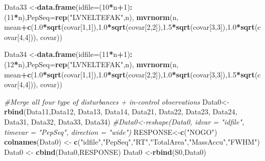 \documentclass[]{article}
\newenvironment{Shaded}{\begin{snugshade}}{\end{snugshade}}
\newcommand{\KeywordTok}[1]{\textcolor[rgb]{0.13,0.29,0.53}{\textbf{#1}}}
\newcommand{\DataTypeTok}[1]{\textcolor[rgb]{0.13,0.29,0.53}{#1}}
\newcommand{\DecValTok}[1]{\textcolor[rgb]{0.00,0.00,0.81}{#1}}
\newcommand{\FloatTok}[1]{\textcolor[rgb]{0.00,0.00,0.81}{#1}}
\newcommand{\StringTok}[1]{\textcolor[rgb]{0.31,0.60,0.02}{#1}}
\newcommand{\CommentTok}[1]{\textcolor[rgb]{0.56,0.35,0.01}{\textit{#1}}}
\newcommand{\OperatorTok}[1]{\textcolor[rgb]{0.81,0.36,0.00}{\textbf{#1}}}
\newcommand{\NormalTok}[1]{#1}
\begin{document}
\begin{Shaded}
\begin{Highlighting}[]
\NormalTok{Data33 <-}\KeywordTok{data.frame}\NormalTok{(}\DataTypeTok{idfile=}\NormalTok{(}\DecValTok{10}\OperatorTok{*}\NormalTok{n}\OperatorTok{+}\DecValTok{1}\NormalTok{)}\OperatorTok{:}\NormalTok{(}\DecValTok{11}\OperatorTok{*}\NormalTok{n),}\DataTypeTok{PepSeq=}\KeywordTok{rep}\NormalTok{(}\StringTok{"LVNELTEFAK"}\NormalTok{,n),}
                  \KeywordTok{mvrnorm}\NormalTok{(n, mean}\OperatorTok{+}\KeywordTok{c}\NormalTok{(}\FloatTok{1.0}\OperatorTok{*}\KeywordTok{sqrt}\NormalTok{(covar[}\DecValTok{1}\NormalTok{,}\DecValTok{1}\NormalTok{]),}\FloatTok{1.0}\OperatorTok{*}\KeywordTok{sqrt}\NormalTok{(covar[}\DecValTok{2}\NormalTok{,}\DecValTok{2}\NormalTok{]),}\FloatTok{1.5}\OperatorTok{*}\KeywordTok{sqrt}\NormalTok{(covar[}\DecValTok{3}\NormalTok{,}\DecValTok{3}\NormalTok{]),}\FloatTok{1.0}\OperatorTok{*}\KeywordTok{sqrt}\NormalTok{(covar[}\DecValTok{4}\NormalTok{,}\DecValTok{4}\NormalTok{])), }
\NormalTok{                          covar))}

\NormalTok{Data34 <-}\KeywordTok{data.frame}\NormalTok{(}\DataTypeTok{idfile=}\NormalTok{(}\DecValTok{11}\OperatorTok{*}\NormalTok{n}\OperatorTok{+}\DecValTok{1}\NormalTok{)}\OperatorTok{:}\NormalTok{(}\DecValTok{12}\OperatorTok{*}\NormalTok{n),}\DataTypeTok{PepSeq=}\KeywordTok{rep}\NormalTok{(}\StringTok{"LVNELTEFAK"}\NormalTok{,n),}
                  \KeywordTok{mvrnorm}\NormalTok{(n, mean}\OperatorTok{+}\KeywordTok{c}\NormalTok{(}\FloatTok{1.0}\OperatorTok{*}\KeywordTok{sqrt}\NormalTok{(covar[}\DecValTok{1}\NormalTok{,}\DecValTok{1}\NormalTok{]),}\FloatTok{1.0}\OperatorTok{*}\KeywordTok{sqrt}\NormalTok{(covar[}\DecValTok{2}\NormalTok{,}\DecValTok{2}\NormalTok{]),}\FloatTok{1.0}\OperatorTok{*}\KeywordTok{sqrt}\NormalTok{(covar[}\DecValTok{3}\NormalTok{,}\DecValTok{3}\NormalTok{]),}\FloatTok{1.5}\OperatorTok{*}\KeywordTok{sqrt}\NormalTok{(covar[}\DecValTok{4}\NormalTok{,}\DecValTok{4}\NormalTok{])), }
\NormalTok{                          covar))}


\CommentTok{#Merge all four type of disturbances + in-control observations}
\NormalTok{Data0<-}\KeywordTok{rbind}\NormalTok{(Data11,Data12, Data13, Data14, Data21, Data22, Data23, Data24, Data31, Data32, Data33, Data34) }\CommentTok{#Data0<-reshape(Data0, idvar = "idfile", timevar = "PepSeq", direction = "wide")}
\NormalTok{RESPONSE<-}\KeywordTok{c}\NormalTok{(}\StringTok{"NOGO"}\NormalTok{)}
\KeywordTok{colnames}\NormalTok{(Data0) <-}\StringTok{ }\KeywordTok{c}\NormalTok{(}\StringTok{"idfile"}\NormalTok{,}\StringTok{"PepSeq"}\NormalTok{,}\StringTok{"RT"}\NormalTok{,}\StringTok{"TotalArea"}\NormalTok{,}\StringTok{"MassAccu"}\NormalTok{,}\StringTok{"FWHM"}\NormalTok{)}
\NormalTok{Data0 <-}\StringTok{ }\KeywordTok{cbind}\NormalTok{(Data0,RESPONSE)}
\NormalTok{Data0 <-}\KeywordTok{rbind}\NormalTok{(S0,Data0)}
\end{Highlighting}
\end{Shaded}
\end{document}
